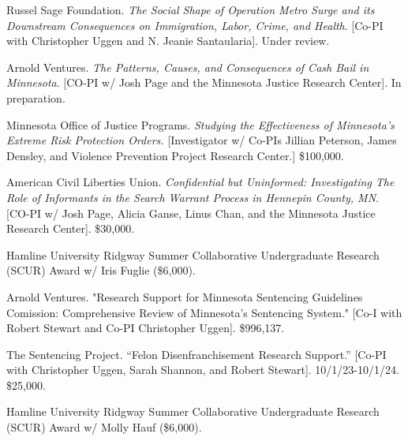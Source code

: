 \documentclass[letterpaper]{article}
\newenvironment{publist}{%
  \begin{list}{}{%
    \setlength{\leftmargin}{0cm}   %
    \setlength{\labelwidth}{2cm}     %
    \setlength{\labelsep}{0.5cm}     %
  }%
}{%
  \end{list}%
}
\begin{document}
\begin{publist}

\item[\textbf{2026}] Russel Sage Foundation. \textit{The Social Shape of Operation Metro Surge and its Downstream Consequences on Immigration, Labor, Crime, and Health}. [Co-PI with Christopher Uggen and N. Jeanie Santaularia]. Under review. 


\item Arnold Ventures. \textit{The Patterns, Causes, and Consequences of Cash Bail in Minnesota}. [CO-PI w/ Josh Page and the Minnesota Justice Research Center]. In preparation.

\item Minnesota Office of Justice Programs. \textit{Studying the Effectiveness of Minnesota's Extreme Risk Protection Orders.} [Investigator w/ Co-PIs Jillian Peterson, James Densley, and Violence Prevention Project Research Center.] \$100,000.

\item American Civil Liberties Union. \textit{Confidential but Uninformed: Investigating The Role of Informants in the Search Warrant Process in Hennepin County, MN}. [CO-PI w/ Josh Page, Alicia Ganse, Linus Chan, and the Minnesota Justice Research Center]. \$30,000.  

\item[\textbf{2025}] Hamline University Ridgway Summer Collaborative Undergraduate Research (SCUR) Award w/ Iris Fuglie (\$6,000).

\item[\textbf{2024-2025}] Arnold Ventures. "Research Support for Minnesota Sentencing Guidelines Comission: Comprehensive Review of Minnesota's Sentencing System." [Co-I with Robert Stewart and Co-PI Christopher Uggen]. \$996,137. 

\item[\textbf{2024}] The Sentencing Project. “Felon Disenfranchisement Research Support.” [Co-PI with Christopher Uggen, Sarah Shannon, and Robert Stewart]. 10/1/23-10/1/24. \$25,000.

\item[\textbf{2023}] Hamline University Ridgway Summer Collaborative Undergraduate Research (SCUR) Award w/ Molly Hauf (\$6,000).


\end{publist}
\end{document}
